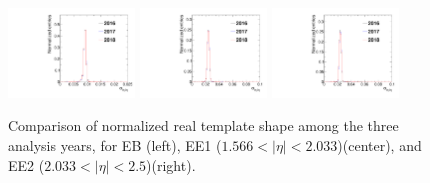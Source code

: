 \begin{figure}[!htbp]
\caption{Comparison of normalized real template shape among the three analysis years, for EB (left), EE1 ($1.566 < |\eta| < 2.033$)(center), and EE2 ($2.033 < \lvert \eta \rvert< 2.5$)(right).}
\centering
\includegraphics[width=0.3\textwidth]{fig/sieie_comparison_EB_diphoton_fake_rate_real_templates_all_GGJets_GJets_pt130To150_chIso5To10.pdf}
\includegraphics[width=0.3\textwidth]{fig/sieie_comparison_EE1_diphoton_fake_rate_real_templates_all_GGJets_GJets_pt130To150_chIso5To10.pdf}
\includegraphics[width=0.3\textwidth]{fig/sieie_comparison_EE2_diphoton_fake_rate_real_templates_all_GGJets_GJets_pt130To150_chIso5To10.pdf}
\label{fig:real_templates_by_year}
\end{figure}

